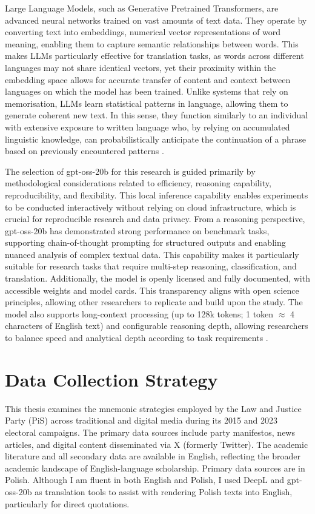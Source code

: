 Large Language Models, such as Generative Pretrained Transformers, are advanced neural networks trained on vast amounts of text data. They operate by converting text into embeddings, numerical vector representations of word meaning, enabling them to capture semantic relationships between words. This makes LLMs particularly effective for translation tasks, as words across different languages may not share identical vectors, yet their proximity within the embedding space allows for accurate transfer of content and context between languages on which the model has been trained. Unlike systems that rely on memorisation, LLMs learn statistical patterns in language, allowing them to generate coherent new text. In this sense, they function similarly to an individual with extensive exposure to written language who, by relying on accumulated linguistic knowledge, can probabilistically anticipate the continuation of a phrase based on previously encountered patterns \citep{mansour2025language}.

The selection of gpt-oss-20b for this research is guided primarily by methodological considerations related to efficiency, reasoning capability, reproducibility, and flexibility. This local inference capability enables experiments to be conducted interactively without relying on cloud infrastructure, which is crucial for reproducible research and data privacy. From a reasoning perspective, gpt-oss-20b has demonstrated strong performance on benchmark tasks, supporting chain-of-thought prompting for structured outputs and enabling nuanced analysis of complex textual data. This capability makes it particularly suitable for research tasks that require multi-step reasoning, classification, and translation. Additionally, the model is openly licensed and fully documented, with accessible weights and model cards. This transparency aligns with open science principles, allowing other researchers to replicate and build upon the study. The model also supports long-context processing (up to 128k tokens; 1 token $\approx$ 4 characters of English text) and configurable reasoning depth, allowing researchers to balance speed and analytical depth according to task requirements \citep{openai_oai_gpt-oss_model_card_2025}.

\section{Data Collection Strategy}

This thesis examines the mnemonic strategies employed by the Law and Justice Party (PiS) across traditional and digital media during its 2015 and 2023 electoral campaigns. The primary data sources include party manifestos, news articles, and digital content disseminated via X (formerly Twitter). The academic literature and all secondary data are available in English, reflecting the broader academic landscape of English-language scholarship. Primary data sources are in Polish. Although I am fluent in both English and Polish, I used DeepL and gpt-oss-20b as translation tools to assist with rendering Polish texts into English, particularly for direct quotations.

